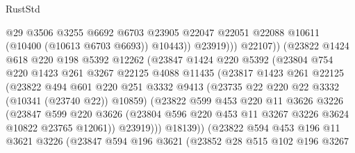 \begin{lexlean}{RustStd}
\begin{coremodule}
                                @29
                                @3506
                                @3255
                                @6692
                                @6703
                                @23905
                                @22047
                                @22051
                                @22088
                                @10611
                                (@10400 (@10613 @6703 @6693))
                                @10443))
                            @23919)))
                      @22107))
                  (@23822
                    @1424
                    @618
                    @220
                    @198
                    @5392
                    @12262
                    (@23847
                      @1424
                      @220
                      @5392
                      (@23804
                        @754
                        @220
                        @1423
                        @261
                        @3267
                        @22125
                        @4088
                        @11435
                        (@23817
                          @1423
                          @261
                          @22125
                          (@23822
                            @494
                            @601
                            @220
                            @251
                            @3332
                            @9413
                            (@23735 @22 @220 @22 @3332 (@10341 (@23740 @22)) @10859)
                            (@23822
                              @599
                              @453
                              @220
                              @11
                              @3626
                              @3226
                              (@23847
                                @599
                                @220
                                @3626
                                (@23804 @596 @220 @453 @11 @3267 @3226 @3624 @10822 @23765 @12061))
                              @23919)))
                        @18139))
                    (@23822
                      @594
                      @453
                      @196
                      @11
                      @3621
                      @3226
                      (@23847
                        @594
                        @196
                        @3621
                        (@23852
                          @28
                          @515
                          @102
                          @196
                          @3267

\end{coremodule}
\end{lexlean}
